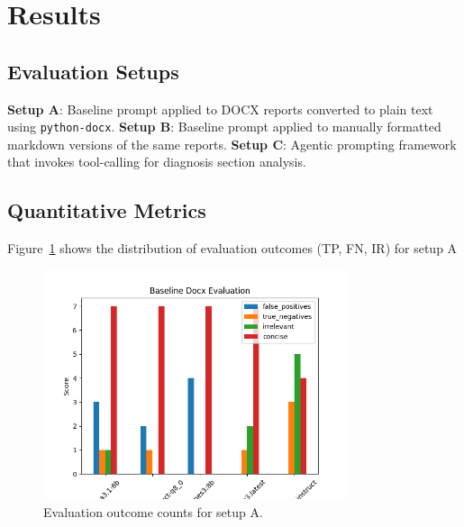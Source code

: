 \section{Results}

\subsection{Evaluation Setups}

\textbf{Setup A}: Baseline prompt applied to DOCX reports converted to plain text using \texttt{python-docx}.  
\textbf{Setup B}: Baseline prompt applied to manually formatted markdown versions of the same reports.  
\textbf{Setup C}: Agentic prompting framework that invokes tool-calling for diagnosis section analysis.

\subsection{Quantitative Metrics}

Figure~\ref{fig:baseline_docx} shows the distribution of evaluation outcomes
(TP, FN, IR) for setup A

\begin{figure}[H]
  \centering
  \includegraphics[width=0.8\textwidth]{baseline_docx.png}
  \caption{Evaluation outcome counts for setup A.}
  \label{fig:baseline_docx}
\end{figure}

